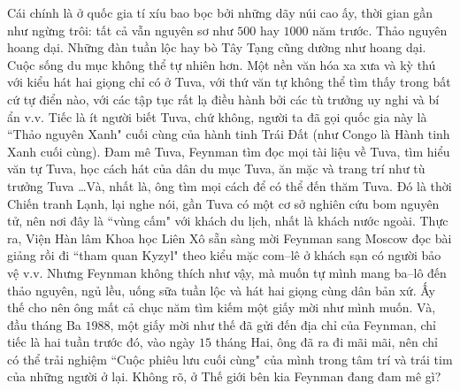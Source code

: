 \begin{multicols}{2}
	Cái chính là ở quốc gia tí xíu bao bọc bởi những dãy núi cao ấy, thời gian gần như ngừng trôi: tất cả vẫn nguyên sơ như $500$ hay $1000$ năm trước. Thảo nguyên hoang dại. Những đàn tuần lộc hay bò Tây Tạng cũng dường như hoang dại. Cuộc sống du mục không thể tự nhiên hơn. Một nền văn hóa xa xưa và kỳ thú với kiểu hát hai giọng chỉ có ở Tuva, với thứ văn tự không thể tìm thấy trong bất cứ tự điển nào, với các tập tục rất lạ điều hành bởi các tù trưởng uy nghi và bí ẩn v.v. Tiếc là ít người biết Tuva, chứ không, người ta đã gọi quốc gia này là ``Thảo nguyên Xanh" cuối cùng của hành tinh Trái Đất (như Congo là Hành tinh Xanh cuối cùng). Đam mê Tuva, Feynman tìm đọc mọi tài liệu về Tuva, tìm hiểu văn tự Tuva, học cách hát của dân du mục Tuva, ăn mặc và trang trí như tù trưởng Tuva \ldots Và, nhất là, ông tìm mọi cách để có thể đến thăm Tuva.
	\vskip 0.1cm
	Đó là thời Chiến tranh Lạnh, lại nghe nói, gần Tuva có một cơ sở nghiên cứu bom nguyên tử, nên nơi đây là ``vùng cấm" với khách du lịch, nhất là khách nước ngoài. Thực ra, Viện Hàn lâm Khoa học Liên Xô sẵn sàng mời Feynman sang Moscow  đọc bài giảng rồi đi ``tham quan Kyzyl" theo kiểu mặc com--lê ở khách sạn có người bảo vệ v.v. Nhưng Feynman không thích như vậy, mà muốn tự mình mang ba--lô đến thảo nguyên, ngủ lều, uống sữa tuần lộc và hát hai giọng cùng dân bản xứ. Ấy thế cho nên ông mất cả chục năm tìm kiếm một giấy mời như mình muốn. Và, đầu tháng Ba $1988$, một giấy mời như thế đã gửi đến địa chỉ của Feynman, chỉ tiếc là hai tuần trước đó, vào ngày $15$ tháng Hai, ông đã ra đi mãi mãi, nên chỉ có thể trải nghiệm ``Cuộc phiêu lưu cuối cùng" của mình trong tâm trí và trái tim của những người ở lại. Không rõ, ở Thế giới bên kia Feynman đang đam mê gì?
	\begin{figure}[H]
		\vspace*{-5pt}
		\centering
		\captionsetup{labelformat= empty, justification=centering}

\end{figure}
\end{multicols}
